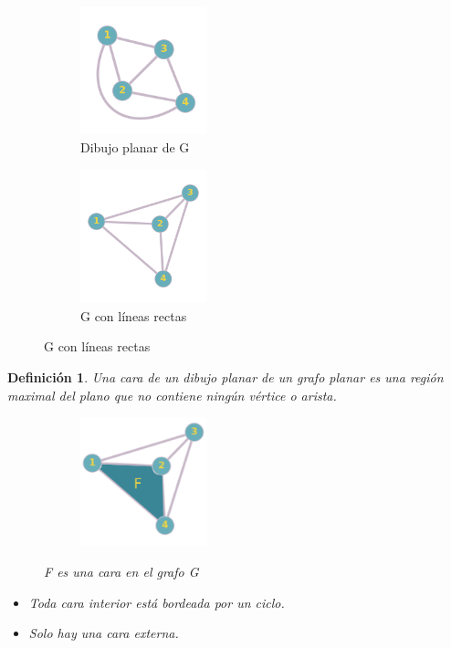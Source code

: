 \documentclass[a4paper,1pt]{report}
\newtheorem*{dfn}{Definición}
\begin{document}
\begin{figure}[H]
    \centering
    \begin{subfigure}[b]{0.45\textwidth}
    \centering
    \includegraphics[width=0.4\textwidth]{figures5/Gplanar.png}
    \caption{Dibujo planar de G}
    \end{subfigure}
    \begin{subfigure}[b]{0.45\textwidth}
        \centering
    \includegraphics[width=0.4\textwidth]{figures5/Grectas.png}
    \caption{G con l\'ineas rectas}
    \end{subfigure}
\end{figure} 

\begin{dfn}
Una cara de un dibujo planar de un grafo planar es una región maximal del plano que no contiene ningún vértice o arista. 

\begin{figure}[H]
    \centering
    \begin{subfigure}[b]{0.45\textwidth}
    \centering
    \includegraphics[width=0.4\textwidth]{figures5/face.png}
\end{subfigure}
\caption{F es una cara en el grafo G}
\end{figure} 

\begin{itemize}
 \item Toda cara interior está bordeada por un ciclo.
 \item Solo hay una cara externa.
\end{itemize}

\end{dfn}
\end{document}
